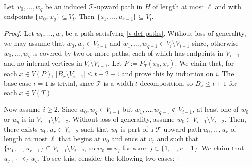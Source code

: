 \documentclass[kpfonts]{patmorin}
\theoremstyle{named}
\begin{document}
\begin{lem}\label{skeleton-paths}
    Let $w_0,\ldots,w_q$ be an induced $\mathcal{T}$-upward path in $H$ of length at most $\ell$ and with endpoints $\{w_0,w_q\}\subseteq V_t$. Then $\{u_1,\ldots,u_{r-1}\}\subseteq V_t$.
\end{lem}

\begin{proof}
    Let $w_0,\ldots,w_q$ be a path satisfying \cref{v-def-paths}. Without loss of generality, we may assume that $w_0,w_q\in V_{i-1}$ and $w_1,\ldots,w_{q-1}\in V_i\setminus V_{i-1}$ since, otherwise $w_0,\ldots,w_q$ is covered by two or more paths, each of which has endpoints in $V_{i-1}$ and no internal vertices in $V_i\setminus V_{i-1}$.
    Let $P:=P_T(x_0,x_q)$.   We claim that, for each $x\in V(P)$, $|B_{x}\setminus V_{i-1}|\le t+2-i$ and prove this by induction on $i$.  The base case $i=1$ is trivial, since $\mathcal{T}$ is a width-$t$ decomposition, so $B_x\le t+1$ for each $x\in V(T)$.

    Now assume $i\ge 2$.  Since $w_0,w_q\in V_{i-1}$ but $w_1,\ldots,w_{q-1}\not\in V_{i-1}$, at least one of $w_0$ or $w_q$ is in $V_{i-1}\setminus V_{i-2}$.  Without loss of generality, assume $w_0\in V_{i-1}\setminus V_{i-2}$.  Then, there exists $u_0,u_r\in V_{i-2}$ such that $w_0$ is part of a $\mathcal{T}$-upward path $u_0,\ldots,u_r$ of length at most $\ell$ that begins at $u_0$ and ends at $u_r$ and such that $\{u_1,\ldots,u_{r-1}\}\subseteq V_{i-1}\setminus V_{i-2}$, so $w_0=u_j$ for some $j\in\{1,\ldots,r-1\}$.  We claim that $u_{j+1}\prec_T w_q$.  To see this, consider the following two cases:


\end{proof}
\end{document}
